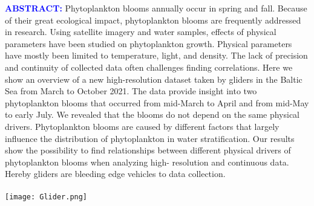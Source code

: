 \documentclass[../Main.tex]{subfiles}
\begin{document}
\begin{tcolorbox}[colback=light-orange, boxrule=0pt]
  \begin{multicols}{3}
    \textcolor{blue}{\textbf{ABSTRACT:}}
Phytoplankton blooms annually occur in spring and fall.
Because of their great ecological impact, phytoplankton blooms are frequently addressed in research.
Using satellite imagery and water samples, effects of physical parameters have been studied on phytoplankton growth.
Physical parameters have mostly been limited to temperature, light, and density.
The lack of precision and continuity of collected data often challenges finding correlations.
Here we show an overview of a new high-resolution dataset taken by gliders in the Baltic Sea from March to October 2021.
The data provide insight into two phytoplankton blooms that occurred from mid-March to April and from mid-May to early July.
We revealed that the blooms do not depend on the same physical drivers. 
Phytoplankton blooms are caused by different factors that largely influence the distribution of phytoplankton in water stratification. 
Our results show the possibility to find relationships between different physical drivers of phytoplankton blooms when analyzing high- resolution and continuous data. 
Hereby gliders are bleeding edge vehicles to data collection.
\ \\
\ \\
    \texttt{[image: Glider.png]}
 \end{multicols}
\end{tcolorbox}
\end{document}
